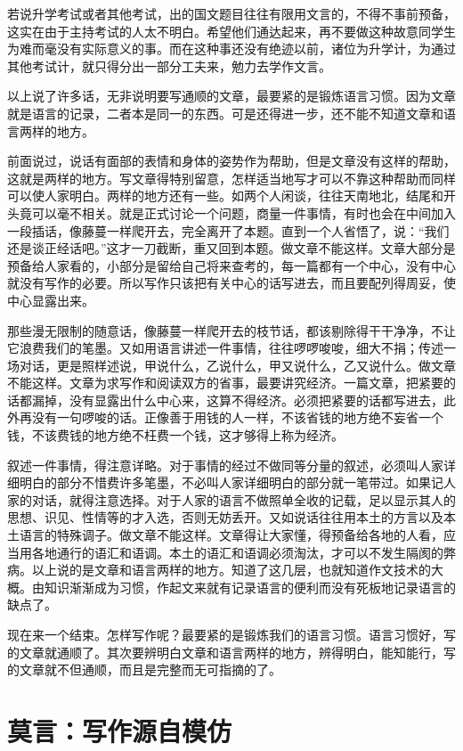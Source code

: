 \documentclass[12pt,a5paper]{ctexbook}
\begin{document}
若说升学考试或者其他考试，出的国文题目往往有限用文言的，不得不事前预备，这实在由于主持考试的人太不明白。希望他们通达起来，再不要做这种故意同学生为难而毫没有实际意义的事。而在这种事还没有绝迹以前，诸位为升学计，为通过其他考试计，就只得分出一部分工夫来，勉力去学作文言。

以上说了许多话，无非说明要写通顺的文章，最要紧的是锻炼语言习惯。因为文章就是语言的记录，二者本是同一的东西。可是还得进一步，还不能不知道文章和语言两样的地方。

前面说过，说话有面部的表情和身体的姿势作为帮助，但是文章没有这样的帮助，这就是两样的地方。写文章得特别留意，怎样适当地写才可以不靠这种帮助而同样可以使人家明白。两样的地方还有一些。如两个人闲谈，往往天南地北，结尾和开头竟可以毫不相关。就是正式讨论一个问题，商量一件事情，有时也会在中间加入一段插话，像藤蔓一样爬开去，完全离开了本题。直到一个人省悟了，说：“我们还是谈正经话吧。”这才一刀截断，重又回到本题。做文章不能这样。文章大部分是预备给人家看的，小部分是留给自己将来查考的，每一篇都有一个中心，没有中心就没有写作的必要。所以写作只该把有关中心的话写进去，而且要配列得周妥，使中心显露出来。

那些漫无限制的随意话，像藤蔓一样爬开去的枝节话，都该剔除得干干净净，不让它浪费我们的笔墨。又如用语言讲述一件事情，往往啰啰唆唆，细大不捐；传述一场对话，更是照样述说，甲说什么，乙说什么，甲又说什么，乙又说什么。做文章不能这样。文章为求写作和阅读双方的省事，最要讲究经济。一篇文章，把紧要的话都漏掉，没有显露出什么中心来，这算不得经济。必须把紧要的话都写进去，此外再没有一句啰唆的话。正像善于用钱的人一样，不该省钱的地方绝不妄省一个钱，不该费钱的地方绝不枉费一个钱，这才够得上称为经济。

叙述一件事情，得注意详略。对于事情的经过不做同等分量的叙述，必须叫人家详细明白的部分不惜费许多笔墨，不必叫人家详细明白的部分就一笔带过。如果记人家的对话，就得注意选择。对于人家的语言不做照单全收的记载，足以显示其人的思想、识见、性情等的才入选，否则无妨丢开。又如说话往往用本土的方言以及本土语言的特殊调子。做文章不能这样。文章得让大家懂，得预备给各地的人看，应当用各地通行的语汇和语调。本土的语汇和语调必须淘汰，才可以不发生隔阂的弊病。以上说的是文章和语言两样的地方。知道了这几层，也就知道作文技术的大概。由知识渐渐成为习惯，作起文来就有记录语言的便利而没有死板地记录语言的缺点了。

现在来一个结束。怎样写作呢？最要紧的是锻炼我们的语言习惯。语言习惯好，写的文章就通顺了。其次要辨明白文章和语言两样的地方，辨得明白，能知能行，写的文章就不但通顺，而且是完整而无可指摘的了。

\newpage

\section{莫言：写作源自模仿}
\end{document}
